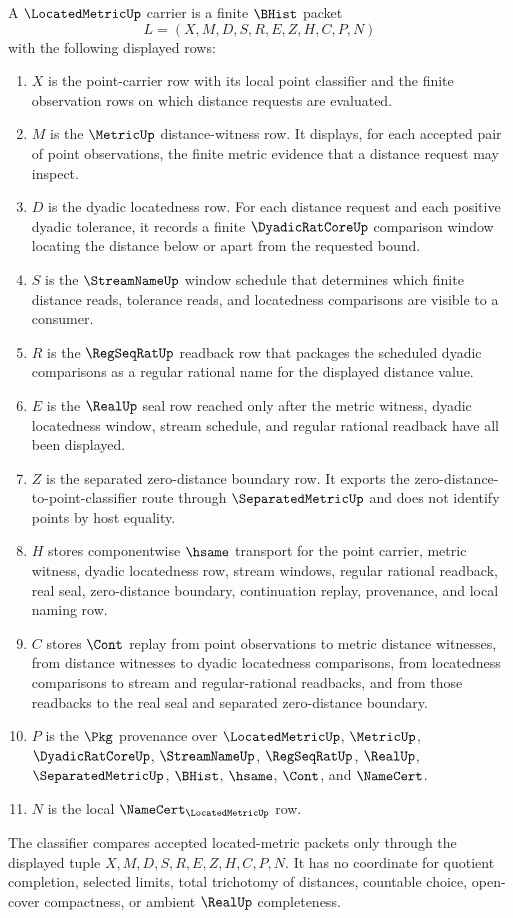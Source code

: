 \begin{definition}
\label{def:located-metric-carrier}
A $\LocatedMetricUp$ carrier is a finite $\BHist$ packet
$$
L=(X,M,D,S,R,E,Z,H,C,P,N)
$$
with the following displayed rows:
\begin{enumerate}
\item $X$ is the point-carrier row with its local point classifier and the finite observation rows on which distance requests are evaluated.
\item $M$ is the $\MetricUp$ distance-witness row. It displays, for each accepted pair of point observations, the finite metric evidence that a distance request may inspect.
\item $D$ is the dyadic locatedness row. For each distance request and each positive dyadic tolerance, it records a finite $\DyadicRatCoreUp$ comparison window locating the distance below or apart from the requested bound.
\item $S$ is the $\StreamNameUp$ window schedule that determines which finite distance reads, tolerance reads, and locatedness comparisons are visible to a consumer.
\item $R$ is the $\RegSeqRatUp$ readback row that packages the scheduled dyadic comparisons as a regular rational name for the displayed distance value.
\item $E$ is the $\RealUp$ seal row reached only after the metric witness, dyadic locatedness window, stream schedule, and regular rational readback have all been displayed.
\item $Z$ is the separated zero-distance boundary row. It exports the zero-distance-to-point-classifier route through $\SeparatedMetricUp$ and does not identify points by host equality.
\item $H$ stores componentwise $\hsame$ transport for the point carrier, metric witness, dyadic locatedness row, stream windows, regular rational readback, real seal, zero-distance boundary, continuation replay, provenance, and local naming row.
\item $C$ stores $\Cont$ replay from point observations to metric distance witnesses, from distance witnesses to dyadic locatedness comparisons, from locatedness comparisons to stream and regular-rational readbacks, and from those readbacks to the real seal and separated zero-distance boundary.
\item $P$ is the $\Pkg$ provenance over $\LocatedMetricUp$, $\MetricUp$, $\DyadicRatCoreUp$, $\StreamNameUp$, $\RegSeqRatUp$, $\RealUp$, $\SeparatedMetricUp$, $\BHist$, $\hsame$, $\Cont$, and $\NameCert$.
\item $N$ is the local $\NameCert_{\LocatedMetricUp}$ row.
\end{enumerate}
The classifier compares accepted located-metric packets only through the displayed tuple $X,M,D,S,R,E,Z,H,C,P,N$. It has no coordinate for quotient completion, selected limits, total trichotomy of distances, countable choice, open-cover compactness, or ambient $\RealUp$ completeness.
\end{definition}

